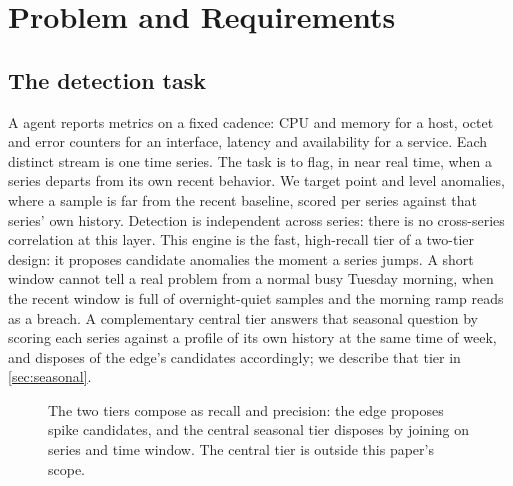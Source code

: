 \section{Problem and Requirements}
\label{sec:motivation}

\subsection{The detection task}
A \sysname{} agent reports metrics on a fixed cadence: CPU and memory for a host,
octet and error counters for an interface, latency and availability for a service.
Each distinct stream is one time series. The task is to flag, in near real time,
when a series departs from its own recent behavior. We target point and level
anomalies, where a sample is far from the recent baseline, scored per series
against that series' own history. Detection is independent across series: there is
no cross-series correlation at this layer. This engine is the fast, high-recall
tier of a two-tier design: it proposes candidate anomalies the moment a series
jumps. A short window cannot tell a real problem from a normal busy Tuesday
morning, when the recent window is full of overnight-quiet samples and the morning
ramp reads as a breach. A complementary central tier answers that seasonal question
by scoring each series against a profile of its own history at the same time of
week, and disposes of the edge's candidates accordingly; we describe that tier in
\cref{sec:seasonal}.

\begin{figure}[t]
  \centering
  \caption{The two tiers compose as recall and precision: the edge proposes spike
  candidates, and the central seasonal tier disposes by joining on series and time
  window. The central tier is outside this paper's scope.}
  \label{fig:tiers}
\end{figure}

